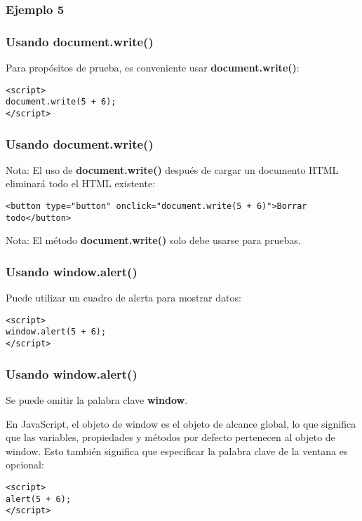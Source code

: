\begin{frame}[fragile]
  \frametitle{Ejemplo 5}
  
\end{frame}

\begin{frame}[fragile]
  \frametitle{Usando document.write()}

  Para propósitos de prueba, es conveniente usar
  \textbf{document.write()}:

  \vspace{\baselineskip}
  \begin{lstlisting}
<script>
document.write(5 + 6);
</script>
  \end{lstlisting}
\end{frame}

\begin{frame}[fragile]
  \frametitle{Usando document.write()}

  \begin{alertblock}{Nota:}
    El uso de \textbf{document.write()} después de cargar un
    documento HTML eliminará todo el HTML existente:
  \end{alertblock}

  \vspace{\baselineskip}
  \begin{lstlisting}
<button type="button" onclick="document.write(5 + 6)">Borrar todo</button>
  \end{lstlisting}

  \begin{exampleblock}{Nota:}
    El método \textbf{document.write()} solo debe usarse para pruebas.
  \end{exampleblock}
\end{frame}

\begin{frame}[fragile]
  \frametitle{Usando window.alert()}

  Puede utilizar un cuadro de alerta para mostrar datos:

  \vspace{\baselineskip}
  \begin{lstlisting}
<script>
window.alert(5 + 6);
</script>
  \end{lstlisting}
\end{frame}

\begin{frame}[fragile]
  \frametitle{Usando window.alert()}

  Se puede omitir la palabra clave \textbf{window}.

  \vspace{\baselineskip}
  En JavaScript, el objeto de window es el objeto de alcance global,
  lo que significa que las variables, propiedades y métodos por
  defecto pertenecen al objeto de window. Esto también significa que
  especificar la palabra clave de la ventana es opcional:

  \vspace{\baselineskip}
  \begin{lstlisting}
<script>
alert(5 + 6);
</script>
  \end{lstlisting}
\end{frame}

